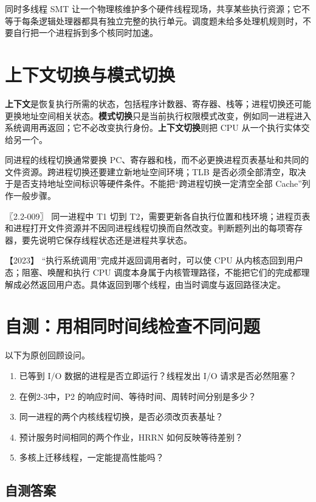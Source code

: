 同时多线程 SMT 让一个物理核维护多个硬件线程现场，共享某些执行资源；它不等于每条逻辑处理器都具有独立完整的执行单元。调度题未给多处理机规则时，不要自行把一个进程拆到多个核同时加速。

\section{上下文切换与模式切换}\label{os-2-10}

\textbf{上下文}是恢复执行所需的状态，包括程序计数器、寄存器、栈等；进程切换还可能更换地址空间相关状态。\textbf{模式切换}只是当前执行权限模式改变，例如同一进程进入系统调用再返回；它不必改变执行身份。\textbf{上下文切换}则把 CPU 从一个执行实体交给另一个。

同进程的线程切换通常要换 PC、寄存器和栈，而不必更换进程页表基址和共同的文件资源。跨进程切换还要建立新地址空间环境；TLB 是否必须全部清空，取决于是否支持地址空间标识等硬件条件。不能把``跨进程切换一定清空全部 Cache''列作一般步骤。

\noindent{}〖2.2-009〗 同一进程中 T1 切到 T2，需要更新各自执行位置和栈环境；进程页表和进程打开文件资源并不因同进程线程切换而自然改变。判断题列出的每项寄存器，要先说明它保存线程状态还是进程共享状态。

\noindent{}【2023】 ``执行系统调用''完成并返回调用者时，可以使 CPU 从内核态回到用户态；阻塞、唤醒和执行 CPU 调度本身属于内核管理路径，不能把它们的完成都理解成必然返回用户态。具体返回到哪个线程，由当时调度与返回路径决定。

\section{自测：用相同时间线检查不同问题}\label{os-2-review}

以下为原创回顾设问。

\begin{enumerate}
\def\labelenumi{\arabic{enumi}.}
\tightlist
\item
  已等到 I/O 数据的进程是否立即运行？线程发出 I/O 请求是否必然阻塞？
\item
  在例2-3中，P2 的响应时间、等待时间、周转时间分别是多少？
\item
  同一进程的两个内核线程切换，是否必须改页表基址？
\item
  预计服务时间相同的两个作业，HRRN 如何反映等待差别？
\item
  多核上迁移线程，一定能提高性能吗？
\end{enumerate}

\subsection{自测答案}\label{os-c02-h242}

